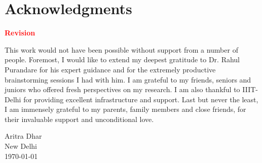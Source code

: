 \section*{Acknowledgments}
\label{section:acknowledgments}
\pagestyle{plain}

\textcolor{red}{\textbf{Revision}}\newline

This work would not have been possible without support from a number of people.
Foremost, I would like to extend my deepest gratitude to Dr. Rahul Purandare for
his expert guidance and for the extremely productive brainstorming sessions I had
with him. I am grateful to my friends, seniors and juniors who offered fresh
perspectives on my research. I am also thankful to IIIT-Delhi for providing
excellent infrastructure and support. Last but never the least, I am immensely
grateful to my parents, family members and close friends, for their invaluable
support and unconditional love.\newline

Aritra Dhar\\
New Delhi\\
\today\\

